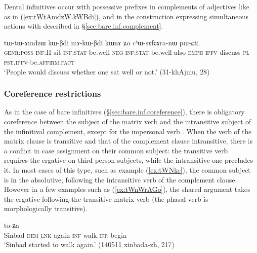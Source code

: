 Dental infinitives occur with possessive prefixes in complements of adjectives like  as in (\ref{ex:tWtAmdzW.kWBdi}), and in the construction expressing simultaneous actions with  described in §\ref{sec:bare.inf.complement}.

\begin{exe}
\ex \label{ex:tWtAmdzW.kWBdi}
\gll tɯ-tɯ-ɤmdzɯ kɯ-βdi mɤ-kɯ-βdi kɯnɤ ʑo cʰɯ-sɤfɕɤra-nɯ pɯ-ɕti.  \\
\textsc{genr}:\textsc{poss}-\textsc{inf}:II-sit \textsc{inf}:\textsc{stat}-be.well \textsc{neg}-\textsc{inf}:\textsc{stat}-be.well also \textsc{emph} \textsc{ipfv}-discuss-\textsc{pl} \textsc{pst}.\textsc{ipfv}-be.\textsc{affirm}:\textsc{fact} \\
\glt `People would discuss whether one sat well or not.' (31-khAjmu, 28)
\end{exe}

\subsubsection{Coreference restrictions} \label{sec:dental.inf.coreference}
As in the case of bare infinitives (§\ref{sec:bare.inf.coreference}), there is obligatory coreference between the subject of the matrix verb and the intransitive subject of the  infinitival complement, except for the  impersonal verb . When the verb of the matrix clause is transitive and that of the complement clause intransitive, there is a conflict in case assignment on their common subject: the transitive verb requires the ergative on third person subjects, while the intransitive one precludes it. In most cases of this type, such as example (\ref{ex:tWNke}), the common subject is in the absolutive, following the intransitive verb of the complement clause. However in a few examples such as (\ref{ex:tWnWrAGo}), the shared argument takes the ergative following the transitive matrix verb (the phasal verb  is morphologically transitive).  

\begin{exe}
\ex \label{ex:tWNke}
 to-ʑa \\
Sinbad \textsc{dem} \textsc{lnk} again  \textsc{inf}-walk \textsc{ifr}-begin \\
\glt `Sinbad started to walk again.' (140511 xinbada-zh, 217)
\end{exe}

